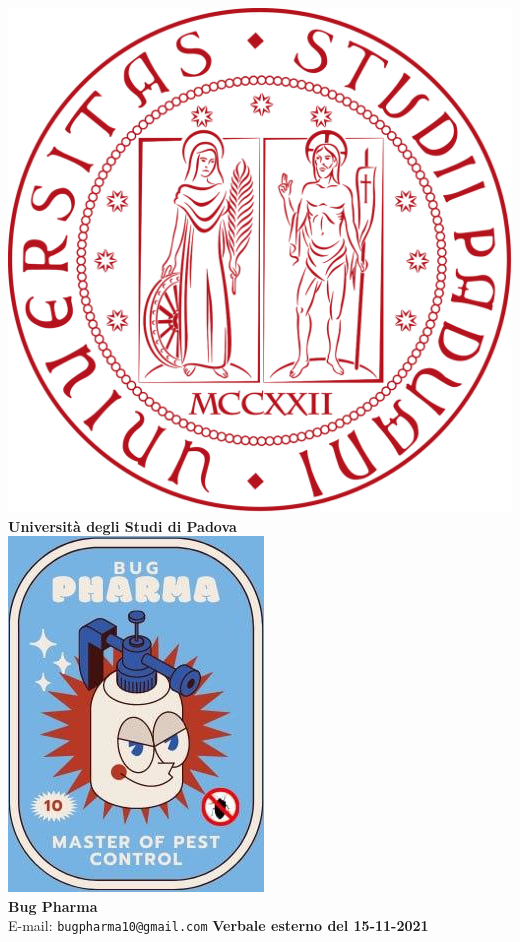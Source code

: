 \documentclass[11pt]{article}
\begin{document}
	\thispagestyle{empty}
	\begin{titlepage}
		\begin{center}
			\includegraphics[scale = 0.05]{../logo_unipd.png}\\
			\large \textbf{Università degli Studi di Padova} \\
			\vfill
			\includegraphics[scale = 0.7]{../logo_small.jpg}\\
			\large \textbf{Bug Pharma} \\
			\vfill
			\large
			E-mail: 
			\texttt{bugpharma10@gmail.com}
			\vfill
			\Huge \textbf{Verbale esterno del 15-11-2021}\\
			

\end{center}
\end{titlepage}
\end{document}

